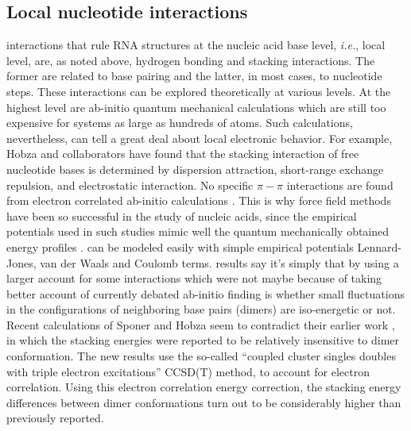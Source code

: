 \subsection{Local nucleotide interactions}
interactions that rule RNA structures  at the nucleic acid base level,
\textit{i.e.}, local level, are,  as noted above, hydrogen bonding and
stacking interactions. The former are  related to base pairing and the
latter, in most cases, to  nucleotide steps. These interactions can be
explored  theoretically at various  levels. At  the highest  level are
ab-initio  quantum   mechanical  calculations  which   are  still  too
expensive  for   systems  as  large   as  hundreds  of   atoms.   Such
calculations,  nevertheless,  can  tell   a  great  deal  about  local
electronic behavior.  For example,  Hobza and collaborators have found
that the  stacking interaction of free nucleotide  bases is determined
by   dispersion  attraction,   short-range  exchange   repulsion,  and
electrostatic  interaction.  No  specific  $\pi-\pi$ interactions  are
found     from    electron    correlated     ab-initio    calculations
\cite{sponer1996, sponer1997}.   This is why force  field methods have
been so successful in the  study of nucleic acids, since the empirical
potentials used  in such studies  mimic well the  quantum mechanically
obtained  energy profiles \cite{tung2004,  sponer2000}.  %
can be modeled easily with simple empirical potentials %
Lennard-Jones, van  der Waals  and Coulomb terms.   %
results say it's  simply that by using a larger %
account for  some interactions which  were not %
maybe because  of taking better account of  %
currently debated  ab-initio finding is whether  small fluctuations in
the   configurations   of   neighboring   base  pairs   (dimers)   are
iso-energetic  or  not.   Recent  calculations  of  Sponer  and  Hobza
\cite{sponer2006}    seem   to    contradict   their    earlier   work
\cite{sponer2000,  hobza2002},  in which  the  stacking energies  were
reported to  be relatively insensitive to dimer  conformation. The new
results  use  the so-called  ``coupled  cluster  singles doubles  with
triple electron excitations'' CCSD(T)  method, to account for electron
correlation.  Using  this electron correlation  energy correction, the
stacking energy differences between dimer conformations turn out to be
considerably higher than previously reported.

